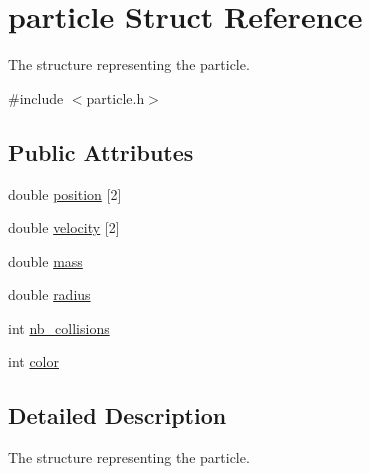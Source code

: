 \hypertarget{structparticle}{\section{particle Struct Reference}
\label{structparticle}
}


The structure representing the particle.  




{\ttfamily \#include $<$particle.\-h$>$}

\subsection*{Public Attributes}
\begin{DoxyCompactItemize}
\item 
double \hyperlink{structparticle_a38d2e3b9410ef872a9428370336ab743}{position} \mbox{[}2\mbox{]}
\item 
double \hyperlink{structparticle_a51c152e3485304dad23614ca1dcf416f}{velocity} \mbox{[}2\mbox{]}
\item 
double \hyperlink{structparticle_a37f838ffbedd34713ac24784a7f33a80}{mass}
\item 
double \hyperlink{structparticle_a9f269f871b1e0da6aadc52ea459e90fa}{radius}
\item 
int \hyperlink{structparticle_aad4464e45831e45c9674a436d008a4a8}{nb\-\_\-collisions}
\item 
int \hyperlink{structparticle_ae69e1b87d7b05a3f4441ebf855fd63e2}{color}
\end{DoxyCompactItemize}


\subsection{Detailed Description}
The structure representing the particle. 

